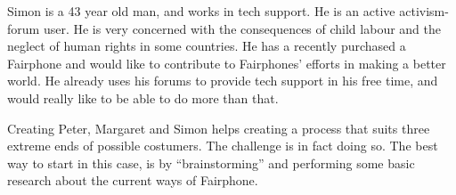 \documentclass[final]{scrreprt} %
\begin{document}
Simon is a 43 year old man, and works in tech support. He is an active activism-forum user. He is very concerned with the consequences of child labour and the neglect of human rights in some countries. He has a recently purchased a Fairphone and would like to contribute to Fairphones' efforts in making a better world. He already uses his forums to provide tech support in his free time, and would really like to be able to do more than that.

Creating Peter, Margaret and Simon helps creating a process that suits three extreme ends of possible costumers. The challenge is in fact doing so. The best way to start in this case, is by ``brainstorming'' and performing some basic research about the current ways of Fairphone.
\end{document}
